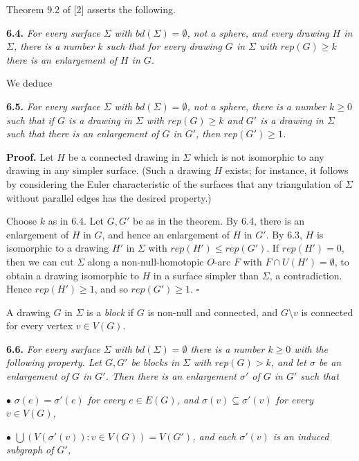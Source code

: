 Theorem 9.2 of [2] asserts the following.

\textbf{6.4.} \textit{For every surface $\Sigma$ with $bd(\Sigma) = \emptyset$, not a sphere, and every drawing $H$ in $\Sigma$, there is a number $k$ such that for every drawing $G$ in $\Sigma$ with $rep(G)\ge k$ there is an enlargement of $H$ in $G$.}

We deduce

\textbf{6.5.} \textit{For every surface $\Sigma$ with $bd(\Sigma) = \emptyset$, not a sphere, there is a number $k\ge 0$ such that if $G$ is a drawing in $\Sigma$ with $rep(G)\ge k$ and $G'$ is a drawing in $\Sigma$ such that there is an enlargement of $G$ in $G'$, then $rep(G')\ge 1$.}

\textbf{Proof.} Let $H$ be a connected drawing in $\Sigma$ which is not isomorphic to any drawing in any simpler surface. (Such a drawing $H$ exists; for instance, it follows by considering the Euler characteristic of the surfaces that any triangulation of $\Sigma$ without parallel edges has the desired property.)

Choose $k$ as in 6.4. Let $G, G'$ be as in the theorem. By 6.4, there is an enlargement of $H$ in $G$, and hence an enlargement of $H$ in $G'$. By 6.3, $H$ is isomorphic to a drawing $H'$ in $\Sigma$ with $rep(H')\le rep(G')$. If $rep(H') = 0$, then we can cut $\Sigma$ along a non-null-homotopic $O$-arc $F$ with $F\cap U(H') = \emptyset$, to obtain a drawing isomorphic to $H$ in a surface simpler than $\Sigma$, a contradiction. Hence $rep(H')\ge 1$, and so $rep(G')\ge 1$. $\square$

A drawing $G$ in $\Sigma$ is a \textit{block} if $G$ is non-null and connected, and $G\setminus v$ is connected for every vertex $v\in V(G)$.

\textbf{6.6.} \textit{For every surface $\Sigma$ with $bd(\Sigma) = \emptyset$ there is a number $k\ge 0$ with the following property. Let $G, G'$ be blocks in $\Sigma$ with $rep(G)>k$, and let $\sigma$ be an enlargement of $G$ in $G'$. Then there is an enlargement $\sigma'$ of $G$ in $G'$ such that}

\hspace*{12pt}$\bullet$ \textit{$\sigma(e) = \sigma'(e)$ for every $e\in E(G)$, and $\sigma(v)\subseteq \sigma'(v)$ for every $v\in V(G)$,}

\hspace*{12pt}$\bullet$ \textit{$\bigcup(V(\sigma'(v)) : v\in V(G)) = V(G')$, and each $\sigma'(v)$ is an induced subgraph of $G'$,}

